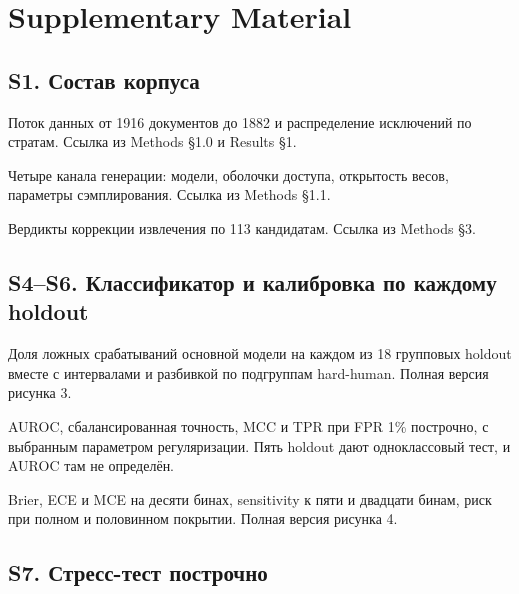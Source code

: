 \documentclass[11pt,a4paper]{article}
\renewcommand{\_}{\textunderscore\allowbreak}
\begin{document}
\clearpage
\renewcommand{\thetable}{S\arabic{table}}
\setcounter{table}{0}
\section{Supplementary Material}

\subsection{S1. Состав корпуса}



Поток данных от 1916 документов до 1882 и распределение исключений по стратам.
Ссылка из Methods §1.0 и Results §1.



Четыре канала генерации: модели, оболочки доступа, открытость весов, параметры
сэмплирования. Ссылка из Methods §1.1.



Вердикты коррекции извлечения по 113 кандидатам. Ссылка из Methods §3.

\subsection{S4–S6. Классификатор и калибровка по каждому holdout}



Доля ложных срабатываний основной модели на каждом из 18 групповых holdout вместе с
интервалами и разбивкой по подгруппам hard-human. Полная версия рисунка 3.



AUROC, сбалансированная точность, MCC и TPR при FPR 1\% построчно, с выбранным
параметром регуляризации. Пять holdout дают одноклассовый тест, и AUROC там не
определён.



Brier, ECE и MCE на десяти бинах, sensitivity к пяти и двадцати бинам, риск при
полном и половинном покрытии. Полная версия рисунка 4.

\subsection{S7. Стресс-тест построчно}


\end{document}

